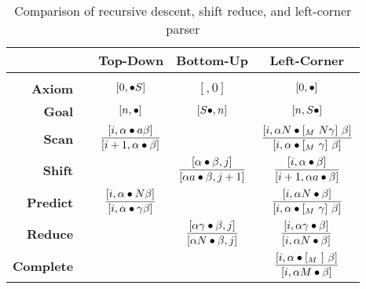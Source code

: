\begin{table}[tbph]
    \begin{tabular}{rp{2em}ccc}
             & & \textbf{Top-Down}
             & \textbf{Bottom-Up}
             & \textbf{Left-Corner}\\[1em]
             \hline
             \\[1em]
        \textbf{Axiom} & &
            \(
                [0,\bullet S]
            \)
            &
            \(
                [,0]
            \)
            &
            \(
                [0,\bullet]
            \)
            \\[2em]
        \textbf{Goal} & &
            \(
                [n,\bullet]
            \)
            &
            \(
                [S\bullet,n]
            \)
            &
            \(
                [n,S \bullet]
            \)
            \\[2em]
        \textbf{Scan} & &
            \(
                \dfrac{[i, \alpha \psep a \beta]}%
                    {[i+1, \alpha \psep \beta]}
            \)
            &
            &
            \(
                \dfrac{[i, \alpha N \psep [_M\ N \gamma ]\ \beta]}%
                    {[i, \alpha \psep [_M\ \gamma ]\ \beta]}
            \)
            \\[2em]
        \textbf{Shift} & &
            &
            \(
                \dfrac{[\alpha \psep \beta, j]}%
                    {[\alpha a \psep \beta, j+1]}
            \)
            &
            \(
                \dfrac{[i, \alpha \psep \beta]}%
                    {[i+1, \alpha a \psep \beta]}
            \)
            \\[2em]
        \textbf{Predict} & &
            \(
                \dfrac{[i, \alpha \psep N \beta]}%
                    {[i, \alpha \psep \gamma \beta]}
            \)
            &
            &
            \(
                \dfrac{[i, \alpha N \psep \beta ]}%
                    {[i, \alpha \psep [_M\ \gamma ]\ \beta ]}
            \)
            \\[2em]
        \textbf{Reduce} & &
            &
            \(
                \dfrac{[\alpha \gamma \psep \beta, j]}%
                    {[\alpha N \psep \beta, j]}
            \)
            &
            \(
                \dfrac{[i, \alpha \gamma \psep \beta]}%
                    {[i, \alpha N \psep \beta]}
            \)
            \\[2em]
        \textbf{Complete} & &
            &
            & 
            \(
                \dfrac{[i, \alpha \psep [_M\ ]\ \beta]}%
                    {[i, \alpha M \psep \beta ]}
            \)
    \end{tabular}
\caption{Comparison of recursive descent, shift reduce, and left-corner parser}
\label{tab:LeftCorner_ParserComparison}
\end{table}

